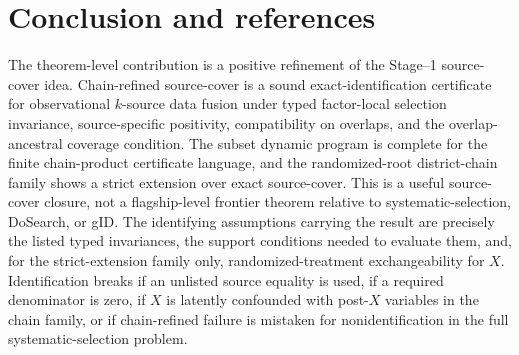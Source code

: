 \documentclass[11pt]{article}
\theoremstyle{definition}
\theoremstyle{plain}
\theoremstyle{remark}
\begin{document}
\section{Conclusion and references}
The theorem-level contribution is a positive refinement of the Stage--1
source-cover idea.  Chain-refined source-cover is a sound
exact-identification certificate for observational \(k\)-source data fusion
under typed factor-local selection invariance, source-specific positivity,
compatibility on overlaps, and the overlap-ancestral coverage condition.  The
subset dynamic program is complete for the finite chain-product certificate
language, and the randomized-root district-chain family shows a strict
extension over exact source-cover.  This is a useful source-cover closure, not
a flagship-level frontier theorem relative to systematic-selection,
DoSearch, or gID.  The identifying assumptions carrying the result are
precisely the listed typed invariances, the support conditions needed to
evaluate them, and, for the strict-extension family only, randomized-treatment
exchangeability for \(X\).  Identification breaks if an unlisted source
equality is used, if a required denominator is zero, if \(X\) is latently
confounded with post-\(X\) variables in the chain family, or if
chain-refined failure is mistaken for nonidentification in the full
systematic-selection problem.
\end{document}
